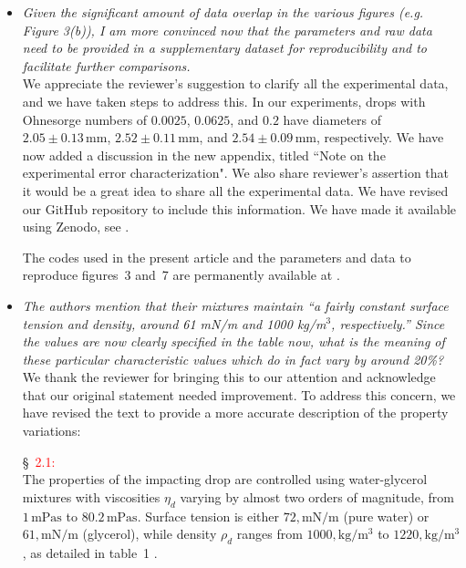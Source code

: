 \documentclass[]{article}
\newcommand*\red{\textcolor{red}}
\newcommand{\oo}{\color{magenta} \normalfont}
\newcommand{\bb}{\color{black} \normalfont}
\begin{document}
\begin{enumerate}
\begin{itemize}
		\item \textit{Given the significant amount of data overlap in the various figures (e.g. Figure 3(b)), I am more convinced now that the parameters and raw data need to be provided in a supplementary dataset for reproducibility and to facilitate further comparisons.}\\[1mm]
		
		We appreciate the reviewer's suggestion to clarify all the experimental data, and we have taken steps to address this. In our experiments, drops with Ohnesorge numbers of $0.0025$, $0.0625$, and $0.2$ have diameters of $2.05 \pm 0.13\,\si{\milli\meter}$, $2.52 \pm 0.11\,\si{\milli\meter}$, and $2.54 \pm 0.09\,\si{\milli\meter}$, respectively. We have now added a discussion in the new appendix, titled ``Note on the experimental error characterization". 
		We also share reviewer's assertion that it would be a great idea to share all the experimental data. We have revised our GitHub repository to include this information. We have made it available using Zenodo, see \citet{basiliskVatsal}.
		
		\oo
		 The codes used in the present article and the parameters and data to reproduce figures~3 and~7 are permanently available at \citet{basiliskVatsal}.\\
		\bb
		
		\item \textit{The authors mention that their mixtures maintain ``a fairly constant surface tension and density, around 61 mN/m and 1000 kg/m$^3$, respectively.'' Since the values are now clearly specified in the table now, what is the meaning of these particular characteristic values which do in fact vary by around 20\%?}\\[1mm]
		
		We thank the reviewer for bringing this to our attention and acknowledge that our original statement needed improvement.
		To address this concern, we have revised the text to provide a more accurate description of the property variations:
				
		\S~\red{2.1:}\\
		\oo
		The properties of the impacting drop are controlled using water-glycerol mixtures with viscosities $\eta_d$ varying by almost two orders of magnitude, from $1\,\si{\milli\pascal}\si{\second}$ to $80.2\,\si{\milli\pascal}\si{\second}$. Surface tension is either $72,\si{\milli\newton}/\si{\meter}$ (pure water) or $61,\si{\milli\newton}/\si{\meter}$ (glycerol), while density $\rho_d$ ranges from $1000,\si{\kilo\gram}/\si{\cubic\meter}$ to $1220,\si{\kilo\gram}/\si{\cubic\meter}$, as detailed in table~1 \citep{cheng2008formula, volk2018density, Jha2020}.
		\bb
	\end{itemize}
	

\end{enumerate}
\end{document}
